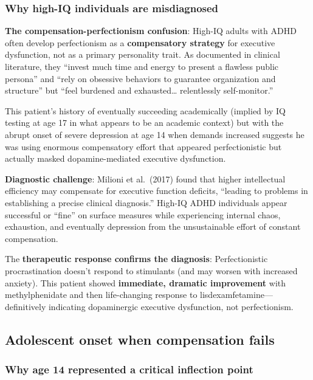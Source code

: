 \subsubsection{Why high-IQ individuals are misdiagnosed}\label{10a_trd_basis-why-high-iq-individuals-are-misdiagnosed}

\textbf{The compensation-perfectionism confusion}: High-IQ adults with ADHD often develop perfectionism as a \textbf{compensatory strategy} for executive dysfunction, not as a primary personality trait. As documented in clinical literature, they ``invest much time and energy to present a flawless public persona'' and ``rely on obsessive behaviors to guarantee organization and structure'' but ``feel burdened and exhausted\ldots{} relentlessly self-monitor.''

This patient's history of eventually succeeding academically (implied by IQ testing at age 17 in what appears to be an academic context) but with the abrupt onset of severe depression at age 14 when demands increased suggests he was using enormous compensatory effort that appeared perfectionistic but actually masked dopamine-mediated executive dysfunction.

\textbf{Diagnostic challenge}: Milioni et al.~(2017) found that higher intellectual efficiency may compensate for executive function deficits, ``leading to problems in establishing a precise clinical diagnosis.'' High-IQ ADHD individuals appear successful or ``fine'' on surface measures while experiencing internal chaos, exhaustion, and eventually depression from the unsustainable effort of constant compensation.

The \textbf{therapeutic response confirms the diagnosis}: Perfectionistic procrastination doesn't respond to stimulants (and may worsen with increased anxiety). This patient showed \textbf{immediate, dramatic improvement} with methylphenidate and then life-changing response to lisdexamfetamine---definitively indicating dopaminergic executive dysfunction, not perfectionism.

\subsection{Adolescent onset when compensation fails}\label{10a_trd_basis-adolescent-onset-when-compensation-fails}

\subsubsection{Why age 14 represented a critical inflection point}\label{10a_trd_basis-why-age-14-represented-a-critical-inflection-point}

